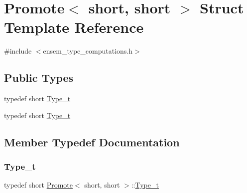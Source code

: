 \hypertarget{structPromote_3_01short_00_01short_01_4}{}\section{Promote$<$ short, short $>$ Struct Template Reference}
\label{structPromote_3_01short_00_01short_01_4}


{\ttfamily \#include $<$ensem\+\_\+type\+\_\+computations.\+h$>$}

\subsection*{Public Types}
\begin{DoxyCompactItemize}
\item 
typedef short \mbox{\hyperlink{structPromote_3_01short_00_01short_01_4_a7be01cb6c481989a8d153e69778ac59a}{Type\+\_\+t}}
\item 
typedef short \mbox{\hyperlink{structPromote_3_01short_00_01short_01_4_a7be01cb6c481989a8d153e69778ac59a}{Type\+\_\+t}}
\end{DoxyCompactItemize}


\subsection{Member Typedef Documentation}
\mbox{\label{structPromote_3_01short_00_01short_01_4_a7be01cb6c481989a8d153e69778ac59a}} 
\subsubsection{\texorpdfstring{Type\_t}{Type\_t}\hspace{0.1cm}{\footnotesize\ttfamily [1/2]}}
{\footnotesize\ttfamily typedef short \mbox{\hyperlink{structPromote}{Promote}}$<$ short, short $>$\+::\mbox{\hyperlink{structPromote_3_01short_00_01short_01_4_a7be01cb6c481989a8d153e69778ac59a}{Type\+\_\+t}}}

\mbox{\label{structPromote_3_01short_00_01short_01_4_a7be01cb6c481989a8d153e69778ac59a}} 
